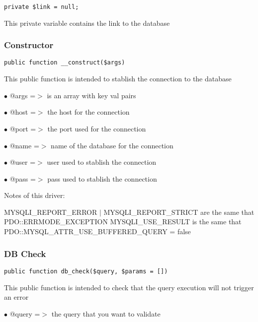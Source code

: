\documentclass[a4paper]{article}
\begin{document}
\begin{lstlisting}
private $link = null;
\end{lstlisting}

This private variable contains the link to the database

\hypertarget{toc321}{}
\subsubsection{Constructor}

\begin{lstlisting}
public function __construct($args)
\end{lstlisting}

This public function is intended to stablish the connection to the database

\begin{compactitem}
\item[\color{myblue}$\bullet$] @args =$>$ is an array with key val pairs
\item[\color{myblue}$\bullet$] @host =$>$ the host for the connection
\item[\color{myblue}$\bullet$] @port =$>$ the port used for the connection
\item[\color{myblue}$\bullet$] @name =$>$ name of the database for the connection
\item[\color{myblue}$\bullet$] @user =$>$ user used to stablish the connection
\item[\color{myblue}$\bullet$] @pass =$>$ pass used to stablish the connection
\end{compactitem}

Notes of this driver:

MYSQLI\_REPORT\_ERROR $|$ MYSQLI\_REPORT\_STRICT are the same that PDO::ERRMODE\_EXCEPTION
MYSQLI\_USE\_RESULT is the same that PDO::MYSQL\_ATTR\_USE\_BUFFERED\_QUERY = false

\hypertarget{toc322}{}
\subsubsection{DB Check}

\begin{lstlisting}
public function db_check($query, $params = [])
\end{lstlisting}

This public function is intended to check that the query execution will not trigger an error

\begin{compactitem}
\item[\color{myblue}$\bullet$] @query =$>$ the query that you want to validate
\end{compactitem}
\end{document}
